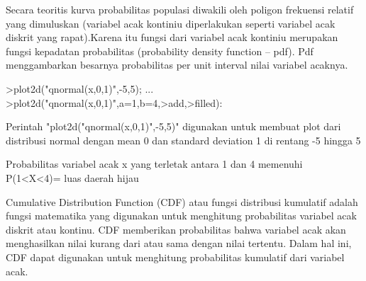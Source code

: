 \documentclass[a4paper,10pt]{article}
\begin{document}
\begin{eulernotebook}
\begin{eulercomment}
\begin{eulercomment}
\begin{eulercomment}
\begin{eulercomment}
\begin{eulercomment}
\begin{eulercomment}
\begin{eulercomment}
\begin{eulercomment}
\begin{eulercomment}
\begin{eulercomment}
\begin{eulercomment}
\begin{eulercomment}
\begin{eulercomment}
\end{eulercomment}
\begin{eulercomment}
Secara teoritis kurva probabilitas populasi diwakili oleh poligon
frekuensi relatif yang dimuluskan (variabel acak  kontiniu
diperlakukan seperti variabel acak diskrit yang rapat).Karena itu
fungsi dari variabel acak kontiniu merupakan fungsi kepadatan
probabilitas (probability density function – pdf). Pdf menggambarkan
besarnya probabilitas per unit interval nilai variabel acaknya.
\end{eulercomment}
\begin{eulerprompt}
>plot2d("qnormal(x,0,1)",-5,5);  ...
>plot2d("qnormal(x,0,1)",a=1,b=4,>add,>filled):
\end{eulerprompt}
\begin{eulercomment}
Perintah "plot2d("qnormal(x,0,1)",-5,5)" digunakan untuk membuat plot
dari distribusi normal dengan mean 0 dan standard deviation 1 di
rentang -5 hingga 5

Probabilitas variabel acak x yang terletak antara 1 dan 4 memenuhi\\
P(1\textless{}X\textless{}4)= luas daerah hijau

\end{eulercomment}
\begin{eulercomment}
Cumulative Distribution Function (CDF) atau fungsi distribusi
kumulatif adalah fungsi matematika yang digunakan untuk menghitung
probabilitas variabel acak diskrit atau kontinu. CDF memberikan
probabilitas bahwa variabel acak akan menghasilkan nilai kurang dari
atau sama dengan nilai tertentu. Dalam hal ini, CDF dapat digunakan
untuk menghitung probabilitas kumulatif dari variabel acak.


\end{eulercomment}
\end{eulercomment}
\end{eulercomment}
\end{eulercomment}
\end{eulercomment}
\end{eulercomment}
\end{eulercomment}
\end{eulercomment}
\end{eulercomment}
\end{eulercomment}
\end{eulercomment}
\end{eulercomment}
\end{eulercomment}
\end{eulernotebook}
\end{document}
